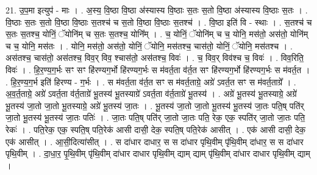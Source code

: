 \documentclass[17pt]{extarticle}
\begin{document}
21. उ॒प॒मा इत्युप॑ - माः । . अ॒स्य॒ वि॒ष्ठा वि॒ष्ठा अ॑स्यास्य वि॒ष्ठाः स॒तः स॒तो वि॒ष्ठा अ॑स्यास्य वि॒ष्ठाः स॒तः । . वि॒ष्ठाः स॒तः स॒तो वि॒ष्ठा वि॒ष्ठाः स॒तश्च॑ च स॒तो वि॒ष्ठा वि॒ष्ठाः स॒तश्च॑ । . वि॒ष्ठा इति॑ वि - स्थाः । . स॒तश्च॑ च स॒तः स॒तश्च॒ योनिं॒ ॅयोनि॑म् च स॒तः स॒तश्च॒ योनि᳚म् । . च॒ योनिं॒ ॅयोनि॑म् च च॒ योनि॒ मस॑तो॒ अस॑तो॒ योनि॑म् च च॒ योनि॒ मस॑तः । . योनि॒ मस॑तो॒ अस॑तो॒ योनिं॒ ॅयोनि॒ मस॑तश्च॒ चास॑तो॒ योनिं॒ ॅयोनि॒ मस॑तश्च । . अस॑तश्च॒ चास॑तो॒ अस॑तश्च॒ विव॒र् विव॒ श्चास॑तो॒ अस॑तश्च॒ विवः॑ । . च॒ विव॒र् विव॑श्च च॒ विवः॑ । . विव॒रिति॒ विवः॑ । . हि॒र॒ण्य॒ग॒र्भः सꣳ सꣳ हि॑रण्यग॒र्भो हि॑रण्यग॒र्भः स म॑वर्त॒ता व॑र्त॒त सꣳ हि॑रण्यग॒र्भो हि॑रण्यग॒र्भः स म॑वर्त॒त । . हि॒र॒ण्य॒ग॒र्भ इति॑ हिरण्य - ग॒र्भः । . स म॑वर्त॒ता व॑र्त॒त सꣳ स म॑वर्त॒ताग्रे॒ अग्रे॑ ऽवर्त॒त सꣳ स म॑वर्त॒ताग्रे᳚ । . अ॒व॒र्त॒ताग्रे॒ अग्रे॑ ऽवर्त॒ता व॑र्त॒ताग्रे॑ भू॒तस्य॑ भू॒तस्याग्रे॑ ऽवर्त॒ता व॑र्त॒ताग्रे॑ भू॒तस्य॑ । . अग्रे॑ भू॒तस्य॑ भू॒तस्याग्रे॒ अग्रे॑ भू॒तस्य॑ जा॒तो जा॒तो भू॒तस्याग्रे॒ अग्रे॑ भू॒तस्य॑ जा॒तः । . भू॒तस्य॑ जा॒तो जा॒तो भू॒तस्य॑ भू॒तस्य॑ जा॒तः पति॒ष् पति॑र् जा॒तो भू॒तस्य॑ भू॒तस्य॑ जा॒तः पतिः॑ । . जा॒तः पति॒ष् पति॑र् जा॒तो जा॒तः पति॒ रेक॒ एक॒ स्पति॑र् जा॒तो जा॒तः पति॒ रेकः॑ । . पति॒रेक॒ एक॒ स्पति॒ष् पति॒रेक॑ आसी दासी॒ देक॒ स्पति॒ष् पति॒रेक॑ आसीत् । . एक॑ आसी दासी॒ देक॒ एक॑ आसीत् । . आ॒सी॒दित्या॑सीत् । . स दा॑धार दाधार॒ स स दा॑धार पृथि॒वीम् पृ॑थि॒वीम् दा॑धार॒ स स दा॑धार पृथि॒वीम् । . दा॒धा॒र॒ पृ॒थि॒वीम् पृ॑थि॒वीम् दा॑धार दाधार पृथि॒वीम् द्याम् द्याम् पृ॑थि॒वीम् दा॑धार दाधार पृथि॒वीम् द्याम् । \newline
\end{document}
